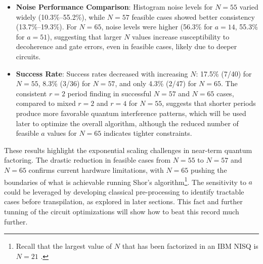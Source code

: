 \documentclass[conference,twoside]{IEEEtran}
\begin{document}
\begin{itemize}
    \item \textbf{Noise Performance Comparison}: Histogram noise levels for $N=55$ varied widely (10.3\%--55.2\%), while $N=57$ feasible cases showed better consistency (13.7\%--19.3\%). For $N=65$, noise levels were higher (56.3\% for $a=14$, 55.3\% for $a=51$), suggesting that larger $N$ values increase susceptibility to decoherence and gate errors, even in feasible cases, likely due to deeper circuits.

    \item \textbf{Success Rate}: Success rates decreased with increasing $N$: 17.5\% (7/40) for $N=55$, 8.3\% (3/36) for $N=57$, and only 4.3\% (2/47) for $N=65$. The consistent $r=2$ period finding in successful $N=57$ and $N=65$ cases, compared to mixed $r=2$ and $r=4$ for $N=55$, suggests that shorter periods produce more favorable quantum interference patterns, which will be used later to optimize the overall algorithm, although the reduced number of feasible $a$ values for $N=65$ indicates tighter constraints. 
\end{itemize}

These results highlight the exponential scaling challenges in near-term quantum factoring. The drastic reduction in feasible cases from $N=55$ to $N=57$ and $N=65$ confirms current hardware limitations, with $N=65$ pushing the boundaries of what is achievable running Shor's algorithm\footnote{Recall that the largest value of $N$ that has been factorized in an IBM NISQ is $N=21$ \citep*{Karamlou2021}. }. The sensitivity to $a$ could be leveraged by developing classical pre-processing to identify tractable cases before transpilation, as explored in later sections. This fact and further tunning of the circuit optimizations will show how to beat this record much further.
\end{document}
